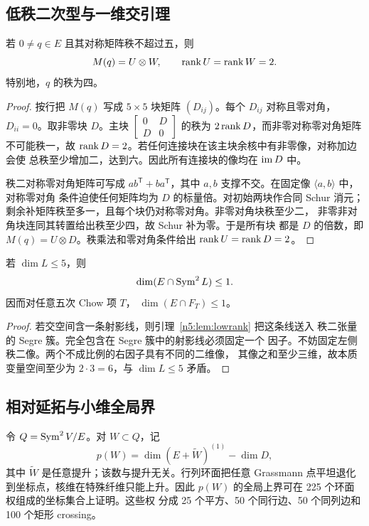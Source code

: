 \subsection{低秩二次型与一维交引理}

\begin{lemma}[秩不超过五的分类]\label{n5:lem:lowrank}
若 \(0\ne q\in E\) 且其对称矩阵秩不超过五，则
\[
 M(q)=U\otimes W,\qquad \operatorname{rank} U=\operatorname{rank} W=2.
\]
特别地，\(q\) 的秩为四。
\end{lemma}

\begin{proof}
按行把 \(M(q)\) 写成 \(5\times5\) 块矩阵 \((D_{ij})\)。每个
\(D_{ij}\) 对称且零对角，\(D_{ii}=0\)。取非零块 \(D\)。主块
\(\left[\begin{smallmatrix}0&D\\D&0\end{smallmatrix}\right]\) 的秩为
\(2\operatorname{rank} D\)，而非零对称零对角矩阵不可能秩一，故
\(\operatorname{rank} D=2\)。若任何连接块在该主块余核中有非零像，对称加边会使
总秩至少增加二，达到六。因此所有连接块的像均在 \(\operatorname{im} D\) 中。

秩二对称零对角矩阵可写成 \(ab^{\mathsf T}+ba^{\mathsf T}\)，其中
\(a,b\) 支撑不交。在固定像 \(\langle a,b\rangle\) 中，对称零对角
条件迫使任何矩阵均为 \(D\) 的标量倍。对初始两块作合同 Schur 消元；
剩余补矩阵秩至多一，且每个块仍对称零对角。非零对角块秩至少二，
非零非对角块连同其转置给出秩至少四，故 Schur 补为零。于是所有块
都是 \(D\) 的倍数，即 \(M(q)=U\otimes D\)。秩乘法和零对角条件给出
\(\operatorname{rank} U=\operatorname{rank} D=2\)。
\end{proof}

\begin{corollary}\label{n5:cor:intersection}
若 \(\dim L\le5\)，则
\[
 \dim(E\cap\operatorname{Sym}^2L)\le1.
\]
因而对任意五次 Chow 项 \(T\)，
\(\dim(E\cap F_T)\le1\)。
\end{corollary}

\begin{proof}
若交空间含一条射影线，则引理~\ref{n5:lem:lowrank} 把这条线送入
秩二张量的 Segre 簇。完全包含在 Segre 簇中的射影线必须固定一个
因子。不妨固定左侧秩二像。两个不成比例的右因子具有不同的二维像，
其像之和至少三维，故本质变量空间至少为 \(2\cdot3=6\)，与
\(\dim L\le5\) 矛盾。
\end{proof}

\subsection{相对延拓与小维全局界}

令 \(Q=\operatorname{Sym}^2V/E\)。对 \(W\subset Q\)，记
\[
 p(W)=\dim(E+\widetilde W)^{(1)}-\dim D,
\]
其中 \(\widetilde W\) 是任意提升；该数与提升无关。行列环面把任意
Grassmann 点平坦退化到坐标点，核维在特殊纤维只能上升。因此
\(p(W)\) 的全局上界可在 225 个环面权组成的坐标集合上证明。这些权
分成 25 个平方、50 个同行边、50 个同列边和 100 个矩形 crossing。

